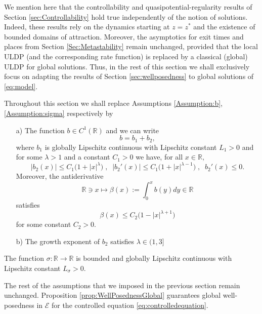 \documentclass[10pt, reqno]{amsart}
\newcommand{\R}{\mathbb{R}}
\newcommand{\e}{\mathcal{E}}
\newenvironment{customthm}[1]
{\renewcommand\theinnercustomthm{#1}\innercustomthm}
{\endinnercustomthm}
\theoremstyle{definition}
\numberwithin{lem}{section}
\numberwithin{cor}{section}
\numberwithin{prop}{section}
\numberwithin{thm}{section}
\numberwithin{dfn}{section}
\begin{document}
We mention here that the controllability and quasipotential-regularity results of Section \ref{sec:Controllability} hold true independently of the notion of solutions. Indeed, these results rely on the dynamics starting at $z=z^*$ and the existence of bounded domains of attraction. Moreover, the asymptotics for exit times and places from Section \ref{Sec:Metastability} remain unchanged, provided that the local ULDP (and the corresponding rate function) is replaced by a classical (global) ULDP for global solutions. Thus, in the rest of this section we shall exclusively focus on adapting the results of Section \ref{sec:wellposedness} to global solutions of \eqref{eq:model}.

Throughout this section we shall replace Assumptions \ref{Assumption:b}, \ref{Assumption:sigma} respectively by 

 \begin{customthm}{1'}\label{Assumption:bGlobal}     
      \begin{enumerate}
          \item[a)] The function $b\in C^1(\R)$ and we can write $$b=b_1+b_2,$$ where $b_1$ is globally Lipschitz continuous with Lipschitz constant $L_1>0$ and for some  $\lambda>1$ and a constant $C_1>0$ we have, for all $x\in\R,$
	   	\begin{equation*}\label{bgrowth}
	   	|b_2(x)|\leq C_1 \big(1+|x|^\lambda\big)\;,\;\;|b_2'(x)|\leq C_1 \big(1+|x|^{\lambda-1}\big)\;,\;\; b_2'(x)\leq 0.
	   	\end{equation*}
	   	Moreover, the antiderivative $$\R\ni x\longmapsto \beta(x):=\int_{0}^{x}b(y)dy\in\R$$ satisfies
	   		\begin{equation}\label{antidercond}
	   \beta(x)\leq C_2\big(1-|x|^{\lambda+1}\big)
	   	\end{equation}
	   	for some constant $C_2>0.$
     \item[b)] The growth exponent of $b_2$ satisfies $\lambda\in(1,3]$
      \end{enumerate}
       \end{customthm}

 \begin{customthm}{2'}\label{Assumption:sigmaGlobal} The function $\sigma:\R\rightarrow\R$ is bounded and globally Lipschitz continuous with Lipschitz constant $L_{\sigma}>0.$
   \end{customthm}
 
 The rest of the assumptions that we imposed in the previous section remain unchanged. Proposition \ref{prop:WellPosednessGlobal} guarantees global well-posedness in $\e$ for the controlled equation \eqref{eq:controlledequation}. 
\end{document}
